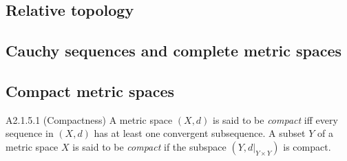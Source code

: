 \subsection{Relative topology}
\subsection{Cauchy sequences and complete metric spaces}
\subsection{Compact metric spaces}
\begin{definition}{A2.1.5.1}
    (Compactness) A metric space $(X, d)$ is said to be \emph{compact} iff every
    sequence in $(X, d)$ has at least one convergent subsequence. A subset $Y$ of
    a metric space $X$ is said to be \emph{compact} if the subspace $(Y, d|_{Y \times Y})$
    is compact.
\end{definition}
